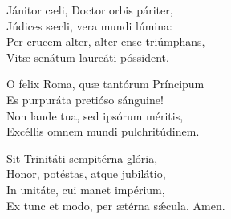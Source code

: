 Jánitor cæli, Doctor orbis páriter,\\
Júdices sæcli, vera mundi lúmina:\\
Per crucem alter, alter ense triúmphans,\\
Vitæ senátum laureáti póssident.

O felix Roma, quæ tantórum Príncipum\\
Es purpuráta pretióso sánguine!\\
Non laude tua, sed ipsórum méritis,\\
Excéllis omnem mundi pulchritúdinem.

Sit Trinitáti sempitérna glória,\\
Honor, potéstas, atque jubilátio,\\
In unitáte, cui manet impérium,\\
Ex tunc et modo, per ætérna sǽcula. Amen.